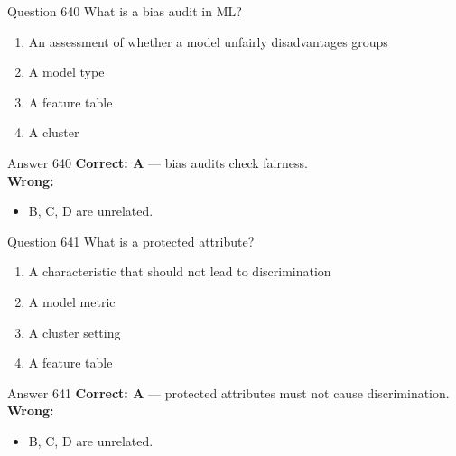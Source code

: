 \documentclass[aspectratio=169,11pt]{beamer}
\begin{document}
	\begin{frame}{Question 640}
		What is a bias audit in ML?
		\begin{enumerate}[label=\Alph*.]
			\item An assessment of whether a model unfairly disadvantages groups
			\item A model type
			\item A feature table
			\item A cluster
		\end{enumerate}
	\end{frame}
	\begin{frame}{Answer 640}
		\textbf{Correct: A} --- bias audits check fairness.\\
		\vspace{0.5em}
		\textbf{Wrong:}
		\begin{itemize}
			\item B, C, D are unrelated.
		\end{itemize}
	\end{frame}
	
	\begin{frame}{Question 641}
		What is a protected attribute?
		\begin{enumerate}[label=\Alph*.]
			\item A characteristic that should not lead to discrimination
			\item A model metric
			\item A cluster setting
			\item A feature table
		\end{enumerate}
	\end{frame}
	\begin{frame}{Answer 641}
		\textbf{Correct: A} --- protected attributes must not cause discrimination.\\
		\vspace{0.5em}
		\textbf{Wrong:}
		\begin{itemize}
			\item B, C, D are unrelated.
		\end{itemize}
	\end{frame}
	
\end{document}
